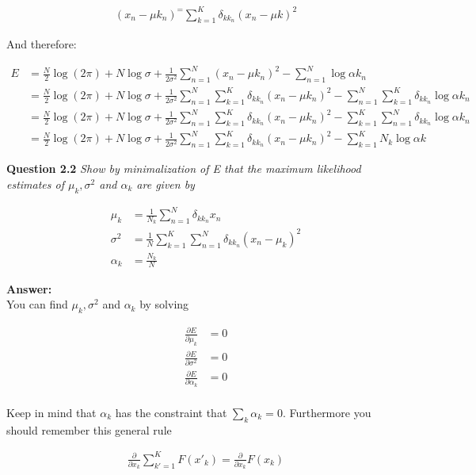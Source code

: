 \documentclass[a4paper]{article}
\begin{document}
\begin{align*}
(x_n - \mu k_n)^= \sum_{k=1}^K \delta_{kk_n} (x_n - \mu k)^2
\end{align*}

And therefore:

\begin{align*}
E &= \frac{N}{2} \log(2 \pi) + N \log \sigma + \frac{1}{2 \sigma^2} \sum_{n=1}^N (x_n - \mu k_n)^2 - \sum_{n=1}^N \log \alpha k_n\\
&=\frac{N}{2} \log(2 \pi) + N \log \sigma + \frac{1}{2 \sigma^2} \sum_{n=1}^N \sum_{k=1}^K \delta_{kk_n} (x_n - \mu k_n)^2 - \sum_{n=1}^N \sum_{k=1}^K \delta_{kk_n} \log \alpha k_n\\
&=\frac{N}{2} \log(2 \pi) + N \log \sigma + \frac{1}{2 \sigma^2} \sum_{n=1}^N \sum_{k=1}^K \delta_{kk_n} (x_n - \mu k_n)^2 - \sum_{k=1}^K \sum_{n=1}^N \delta_{kk_n} \log \alpha k_n\\
&=\frac{N}{2} \log(2 \pi) + N \log \sigma + \frac{1}{2 \sigma^2} \sum_{n=1}^N \sum_{k=1}^K \delta_{kk_n} (x_n - \mu k_n)^2 - \sum_{k=1}^K N_k \log \alpha k
\end{align*}


\textbf{Question 2.2}  \textit{Show by minimalization of E that the maximum likelihood estimates of $\mu_k, \sigma^2$ and $\alpha_k$ are given by }

\begin{align*}
	\mu_k &= \frac{1}{N_k} \sum_{n = 1}^N \delta_{kk_n} x_n\\
	\sigma^2 &= \frac{1}{N} \sum_{k = 1}^K \sum_{n = 1}^N \delta_{kk_n} (x_n - \mu_k)^2\\
	\alpha_k &= \frac{N_k}{N}
\end{align*}

\textbf{Answer:}\\

You can find $\mu_k, \sigma^2$ and $\alpha_k$ by solving

\begin{align*}
\frac{\partial E}{\partial \mu_k} &= 0\\
\frac{\partial E}{\partial \sigma^2} &= 0\\
\frac{\partial E}{\partial \alpha_k} &= 0\\
\end{align*}

Keep in mind that $\alpha_k$ has the constraint that $\sum_k \alpha_k = 0$. Furthermore you should remember this general rule

\begin{align*}
\frac{\partial}{\partial x_k} \sum_{k'=1}^K F(x'_k) = \frac{\partial}{\partial x_k} F(x_k)
\end{align*}
\end{document}
